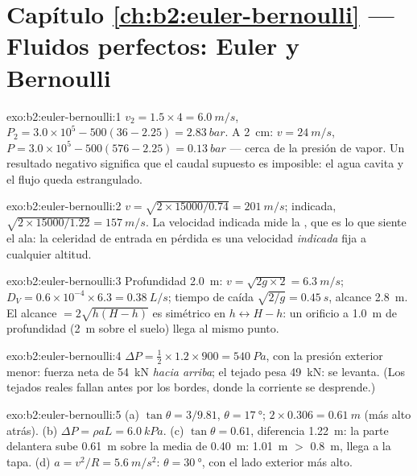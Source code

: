 \section*{Capítulo \ref{ch:b2:euler-bernoulli} --- Fluidos perfectos: Euler y Bernoulli}

\begin{solution}{exo:b2:euler-bernoulli:1}
$v_2 = 1.5 \times 4 = \qty{6.0}{m/s}$, $P_2 = 3.0 \times 10^5 - 500(36 - 2.25) =
\qty{2.83}{bar}$. A \qty{2}{cm}: $v = \qty{24}{m/s}$, $P = 3.0 \times 10^5 - 500
(576 - 2.25) = \qty{0.13}{bar}$ --- cerca de la presión de vapor. Un
resultado negativo significa que el caudal supuesto es imposible: el agua
cavita y el flujo queda estrangulado.
\end{solution}

\begin{solution}{exo:b2:euler-bernoulli:2}
$v = \sqrt{2 \times 15000/0.74} = \qty{201}{m/s}$; indicada, $\sqrt{2 \times 15000/
1.22} = \qty{157}{m/s}$. La velocidad indicada mide la ,
que es lo que siente el ala: la celeridad de entrada en pérdida es una
velocidad \emph{indicada} fija a cualquier altitud.
\end{solution}

\begin{solution}{exo:b2:euler-bernoulli:3}
Profundidad \qty{2.0}{m}: $v = \sqrt{2g \times 2} = \qty{6.3}{m/s}$; $D_V = 0.6 \times 10^{-4}
\times 6.3 = \qty{0.38}{L/s}$; tiempo de caída $\sqrt{2/g} = \qty{0.45}{s}$, alcance
\qty{2.8}{m}. El alcance $= 2\sqrt{h(H - h)}$ es simétrico en $h \leftrightarrow H -
h$: un orificio a \qty{1.0}{m} de profundidad (\qty{2}{m} sobre el suelo) llega al mismo
punto.
\end{solution}

\begin{solution}{exo:b2:euler-bernoulli:4}
$\Delta P = \tfrac12 \times 1.2 \times 900 = \qty{540}{Pa}$, con la presión exterior menor:
fuerza neta de \qty{54}{kN} \emph{hacia arriba}; el tejado pesa \qty{49}{kN}: se
levanta. (Los tejados reales fallan antes por los bordes, donde la corriente se desprende.)
\end{solution}

\begin{solution}{exo:b2:euler-bernoulli:5}
(a) $\tan\theta = 3/9.81$, $\theta = \qty{17}{\degree}$; $2 \times 0.306 = \qty{0.61}{m}$
(más alto atrás). (b) $\Delta P = \rho aL = \qty{6.0}{kPa}$. (c) $\tan\theta =
0.61$, diferencia \qty{1.22}{m}: la parte delantera sube \qty{0.61}{m} sobre la media de
\qty{0.40}{m}: \qty{1.01}{m} $>$ \qty{0.8}{m}, llega a la tapa. (d) $a = v^2/R =
\qty{5.6}{m/s^2}$: $\theta = \qty{30}{\degree}$, con el lado exterior más alto.
\end{solution}

